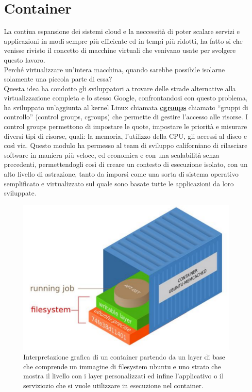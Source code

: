 \documentclass[a4paper,12pt,openright,twoside]{report}
\begin{document}
\tableofcontents
 
\chapter{Container}
La contiua espansione dei sistemi cloud e la neccessità di poter scalare servizi e applicazioni in modi sempre più efficiente ed in tempi più ridotti, ha fatto si che venisse rivisto il concetto di macchine virtuali che venivano usate per svolgere questo lavoro.\\
Perché virtualizzare un’intera macchina, quando sarebbe possibile isolarne solamente una piccola parte di essa?\\
Questa idea ha condotto gli sviluppatori a trovare delle strade alternative alla virtualizzazione completa e lo stesso Google, confrontandosi con questo problema, ha sviluppato un’aggiunta al kernel Linux chiamata \href{https://en.wikipedia.org/wiki/Cgroups}{\textbf{cgroups}} chiamato “gruppi di controllo” (control groups, cgroups) che permette di gestire l’accesso alle risorse. I control groups permettono di impostare le quote, impostare le priorità e misurare diversi tipi di risorse, quali: la memoria, l’utilizzo della CPU, gli accessi al disco e così via. Questo modulo ha permesso al team di sviluppo californiano di rilasciare software in maniera più veloce, ed economica e con una scalabilità senza precedenti, permettendogli così di creare un contesto di esecuzione isolato, con un alto livello di astrazione, tanto da imporsi come una sorta di sistema operativo semplificato e virtualizzato sul quale sono basate tutte le applicazioni da loro sviluppate.\\
\begin{figure}[H]
	\begin{center}
		\includegraphics[width=0.99\columnwidth]{img/c.pdf}
		\caption{Interpretazione grafica di un container partendo da un layer di base che comprende un immagine di filesystem ubuntu e uno strato che mostra il livello con i layer personalizzati ed infine l'applicativo o il serviziozio che si vuole utilizzare in esecuzione nel container.}
		\label{img:container}
	\end{center}
\end{figure}
\end{document}
